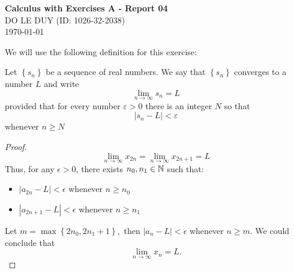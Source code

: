 
\newcommand{\myclass}{Calculus with Exercises A}
\newcommand{\myname}{DO LE DUY}
\newcommand{\myhwtype}{Report 04}
\newcommand{\mystudentid}{1026-32-2038}



\thispagestyle{plain}
\begin{center}
  {\Large \textbf{\myclass{} - \myhwtype{} }}\\
  \vspace{0.6em} {\myname{} (\small{ID: \mystudentid{}})} \\
  \today
\end{center}

 \newline

We will use the following definition for this exercise:
\begin{defi} Let \(\left\{s_{n}\right\}\) be a sequence of real numbers. We say that \(\left\{s_{n}\right\}\) converges to a number \(L\) and write
\[
\lim _{n \rightarrow \infty} s_{n}=L
\]
provided that for every number \(\varepsilon>0\) there is an integer \(N\) so that
\[
\left|s_{n}-L\right|<\varepsilon
\]
whenever \(n \geq N\)
\end{defi}
\begin{proof}
\[\lim _{n \rightarrow \infty} x_{2 n}=\lim _{n \rightarrow \infty} x_{2 n+1}=L\] Thus, for any \(\epsilon>0\), there exists \(n_{0}, n_{1} \in \mathbb{N}\) such that: 
\begin{itemize}
    \item \(|a_{2 n}-L|<\epsilon\) whenever \(n \geq n_{0}\)
    \item \(|a_{2 n+1}-L|<\epsilon\) whenever \(n \geq n_{1}\)
\end{itemize} 
Let \(m=\max \left\{2 n_{0}, 2 n_{1}+1\right\},\) then \(\left|a_{n}-L\right|<\epsilon\) whenever \(n \geq m\). We could conclude that \[ \lim_{n \rightarrow \infty}x_n=L.\]
\end{proof}

 \newline

